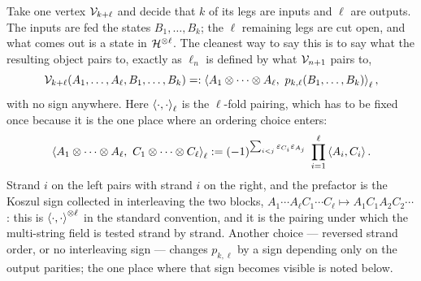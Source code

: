 Take one vertex ${\mathcal{V}}_{k+\ell}$ and decide that $k$ of its legs are inputs and $\ell$ are outputs. The inputs are fed the states $B_1,\dots,B_k$; the $\ell$ remaining legs are cut open, and what comes out is a state in ${\mathcal{H}}^{\otimes\ell}$. The cleanest way to say this is to say what the resulting object pairs to, exactly as $\ell_n$ is defined by what ${\mathcal{V}}_{n+1}$ pairs to,
\begin{equation}
  \label{ibk:eq:gen:pkl}
  \mc V_{k+\ell}(A_1,\dots,A_\ell,B_1,\dots,B_k)
    =: \braket{A_1\otimes\cdots\otimes A_\ell,\ p_{k,\ell}(B_1,\dots,B_k)}_\ell,
\end{equation}
with no sign anywhere. Here $\braket{\cdot,\cdot}_\ell$ is the $\ell$-fold pairing, which has to be fixed once because it is the one place where an ordering choice enters:
\begin{equation}
  \label{ibk:eq:gen:ell-pairing}
  \braket{A_1\otimes\cdots\otimes A_\ell,\ C_1\otimes\cdots\otimes C_\ell}_\ell
    := (-1)^{\sum_{i<j}\varepsilon_{C_i}\varepsilon_{A_j}}\;
      \prod_{i=1}^{\ell}\braket{A_i,C_i}.
\end{equation}
Strand $i$ on the left pairs with strand $i$ on the right, and the prefactor is the Koszul sign collected in interleaving the two blocks, $A_1\cdots A_\ell C_1\cdots C_\ell\mapsto A_1C_1A_2C_2\cdots$: this is $\braket{\cdot,\cdot}^{\otimes\ell}$ in the standard convention, and it is the pairing under which the multi-string field is tested strand by strand. Another choice --- reversed strand order, or no interleaving sign --- changes $p_{k,\ell}$ by a sign depending only on the output parities; the one place where that sign becomes visible is noted below.

